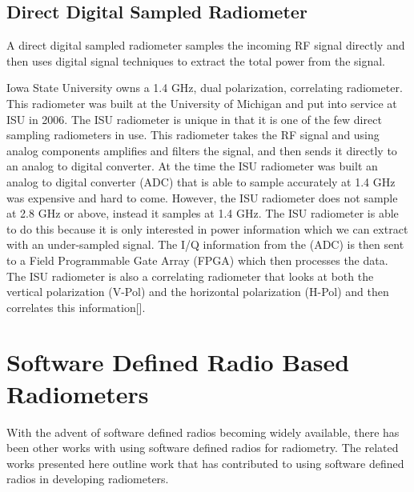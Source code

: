 \subsection{Direct Digital Sampled Radiometer}
A direct digital sampled radiometer samples the incoming RF signal directly and then uses digital signal techniques to extract the total power from the signal. 
  
Iowa State University owns a 1.4 GHz, dual polarization, correlating radiometer.  This radiometer was built at the University of Michigan and put into service at ISU in 2006.  The ISU radiometer is unique in that it is one of the few direct sampling radiometers in use\cite{Erbas}.  This radiometer takes the RF signal and using analog components amplifies and filters the signal, and then sends it directly to an analog to digital converter.  At the time the ISU radiometer was built an analog to digital converter (ADC) that is able to sample accurately at 1.4 GHz was expensive and hard to come.  However, the ISU radiometer does not sample at 2.8 GHz or above, instead it samples at 1.4 GHz.  The ISU radiometer is able to do this because it is only interested in power information which we can extract with an under-sampled signal.  The I/Q information from the (ADC) is then sent to a Field Programmable Gate Array (FPGA) which then processes the data.  The ISU radiometer is also a correlating radiometer that looks at both the vertical polarization (V-Pol) and the horizontal polarization (H-Pol) and then correlates this information[\cite{Fischman2001}]. 

\section{Software Defined Radio Based Radiometers}

With the advent of software defined radios becoming widely available, there has been other works with using software defined radios for radiometry.  The related works presented here outline work that has contributed to using software defined radios in developing radiometers.


